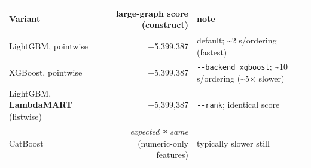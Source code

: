 \documentclass[
  11pt,
]{article}
\begin{document}
\begin{longtable}[]{@{}lrl@{}}
\toprule
\begin{minipage}[b]{0.27\columnwidth}\raggedright
Variant\strut
\end{minipage} & \begin{minipage}[b]{0.37\columnwidth}\raggedleft
large-graph score (construct)\strut
\end{minipage} & \begin{minipage}[b]{0.27\columnwidth}\raggedright
note\strut
\end{minipage}\tabularnewline
\midrule
\endhead
\begin{minipage}[t]{0.27\columnwidth}\raggedright
LightGBM, pointwise\strut
\end{minipage} & \begin{minipage}[t]{0.37\columnwidth}\raggedleft
−5,399,387\strut
\end{minipage} & \begin{minipage}[t]{0.27\columnwidth}\raggedright
default; \textasciitilde2 s/ordering (fastest)\strut
\end{minipage}\tabularnewline
\begin{minipage}[t]{0.27\columnwidth}\raggedright
XGBoost, pointwise\strut
\end{minipage} & \begin{minipage}[t]{0.37\columnwidth}\raggedleft
−5,399,387\strut
\end{minipage} & \begin{minipage}[t]{0.27\columnwidth}\raggedright
\texttt{-\/-backend\ xgboost}; \textasciitilde10 s/ordering
(\textasciitilde5× slower)\strut
\end{minipage}\tabularnewline
\begin{minipage}[t]{0.27\columnwidth}\raggedright
LightGBM, \textbf{LambdaMART} (listwise)\strut
\end{minipage} & \begin{minipage}[t]{0.37\columnwidth}\raggedleft
−5,399,387\strut
\end{minipage} & \begin{minipage}[t]{0.27\columnwidth}\raggedright
\texttt{-\/-rank}; identical score\strut
\end{minipage}\tabularnewline
\begin{minipage}[t]{0.27\columnwidth}\raggedright
CatBoost\strut
\end{minipage} & \begin{minipage}[t]{0.37\columnwidth}\raggedleft
\emph{expected ≈ same} (numeric-only features)\strut
\end{minipage} & \begin{minipage}[t]{0.27\columnwidth}\raggedright
typically slower still\strut
\end{minipage}\tabularnewline
\bottomrule
\end{longtable}
\end{document}
